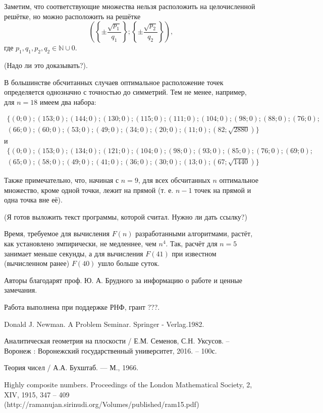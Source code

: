 \documentclass[a4paper,14pt]{article} %
\begin{document}
Заметим, что соответствующие множества нельзя расположить на целочисленной решётке, но можно расположить на решётке 
$$
	\left(
		\left\{\pm\frac{\sqrt{p_1}}{q_1}\right\};
		\left\{\pm\frac{\sqrt{p_2}}{q_2}\right\}
	\right),$$
где $p_1,q_1,p_2,q_2 \in \mathbb{N} \cup{0}$.

(Надо ли это доказывать?).

В большинстве обсчитанных случаев оптимальное расположение точек определяется однозначно с точностью до симметрий.
Тем не менее, например, для $n=18$ имеем два набора:

\begin{multline*}
\{( 0 ; 0 ); ( 153 ; 0 ); ( 144 ; 0 ); ( 130 ; 0 ); ( 115 ; 0 ); ( 111 ; 0 ); ( 104 ; 0 ); ( 98 ; 0 ); ( 88 ; 0 ); ( 76 ; 0 );\\
( 66 ; 0 ); ( 60 ; 0 ); ( 53 ; 0 ); ( 49 ; 0 ); ( 34 ; 0 ); ( 20 ; 0 ); ( 11 ; 0 ); ( 82 ; \sqrt{2880})\}
\end{multline*}
и
\begin{multline*}
\{( 0 ; 0 ); ( 153 ; 0 ); ( 134 ; 0 ); ( 121 ; 0 ); ( 104 ; 0 ); ( 98 ; 0 ); ( 93 ; 0 ); ( 85 ; 0 ); ( 76 ; 0 ); ( 69 ; 0 );\\
( 65 ; 0 ); ( 58 ; 0 ); ( 49 ; 0 ); ( 41 ; 0 ); ( 36 ; 0 ); ( 30 ; 0 ); ( 13 ; 0 ); ( 67 ; \sqrt{1440} )\}
\end{multline*}


Также примечательно, что, начиная с $n=9$, для всех обсчитанных $n$ оптимальное множество, кроме одной точки, лежит на прямой (т. е. $n-1$ точек на прямой и одна точка вне её).

(Я готов выложить текст программы, которой считал. Нужно ли дать ссылку?)

Время, требуемое для вычисления $F(n)$ разработанными алгоритмами, растёт, как установлено эмпирически, не медленнее, чем $n^4$.
Так, расчёт для $n=5$ занимает меньше секунды, а для вычисления $F(41)$ при известном (вычисленном ранее) $F(40)$ ушло больше суток.

Авторы благодарят проф. Ю. А. Брудного за информацию о работе \cite{Newman} и ценные замечания.

Работа выполнена при поддержке РНФ, грант ???.


\begin{thebibliography}{99}

 Donald J. Newman. A Problem Seminar. Springer - Verlag.1982.

 Аналитическая геометрия на плоскости / Е.М. Семенов, С.Н. Уксусов. – Воронеж : Воронежский государственный университет, 2016. – 100с.

 Теория чисел / А.А. Бухштаб. --- М., 1966.

 Highly composite numbers. Proceedings of the London Mathematical Society, 2, XIV, 1915, 347 – 409 (http://ramanujan.sirinudi.org/Volumes/published/ram15.pdf)

\end{thebibliography}
\end{document}
